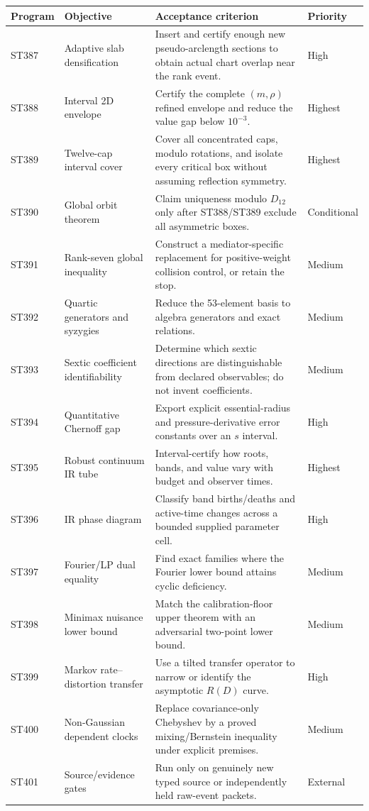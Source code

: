 \documentclass[11pt,a4paper]{article}
\begin{document}
\begin{longtable}{>{\raggedright\arraybackslash}p{}>{\raggedright\arraybackslash}p{}>{\raggedright\arraybackslash}p{}>{\raggedright\arraybackslash}p{}}
\toprule Program&Objective&Acceptance criterion&Priority\\\midrule\endhead
ST387&Adaptive slab densification&Insert and certify enough new pseudo-arclength sections to obtain actual chart overlap near the rank event.&High\\
ST388&Interval 2D envelope&Certify the complete $(m,\rho)$ refined envelope and reduce the value gap below $10^{-3}$.&Highest\\
ST389&Twelve-cap interval cover&Cover all concentrated caps, modulo rotations, and isolate every critical box without assuming reflection symmetry.&Highest\\
ST390&Global orbit theorem&Claim uniqueness modulo $D_{12}$ only after ST388/ST389 exclude all asymmetric boxes.&Conditional\\
ST391&Rank-seven global inequality&Construct a mediator-specific replacement for positive-weight collision control, or retain the stop.&Medium\\
ST392&Quartic generators and syzygies&Reduce the 53-element basis to algebra generators and exact relations.&Medium\\
ST393&Sextic coefficient identifiability&Determine which sextic directions are distinguishable from declared observables; do not invent coefficients.&Medium\\
ST394&Quantitative Chernoff gap&Export explicit essential-radius and pressure-derivative error constants over an $s$ interval.&High\\
ST395&Robust continuum IR tube&Interval-certify how roots, bands, and value vary with budget and observer times.&Highest\\
ST396&IR phase diagram&Classify band births/deaths and active-time changes across a bounded supplied parameter cell.&High\\
ST397&Fourier/LP dual equality&Find exact families where the Fourier lower bound attains cyclic deficiency.&Medium\\
ST398&Minimax nuisance lower bound&Match the calibration-floor upper theorem with an adversarial two-point lower bound.&Medium\\
ST399&Markov rate--distortion transfer&Use a tilted transfer operator to narrow or identify the asymptotic $R(D)$ curve.&High\\
ST400&Non-Gaussian dependent clocks&Replace covariance-only Chebyshev by a proved mixing/Bernstein inequality under explicit premises.&Medium\\
ST401&Source/evidence gates&Run only on genuinely new typed source or independently held raw-event packets.&External\\
\bottomrule
\end{longtable}
\end{document}
